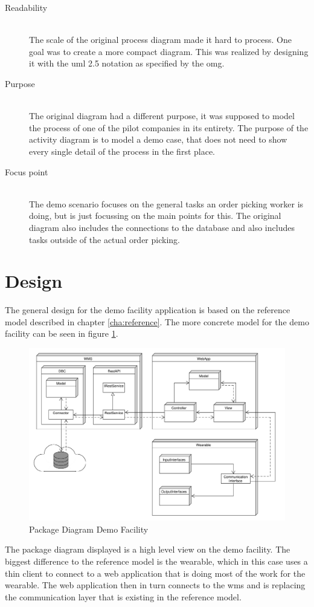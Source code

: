 \begin{description}
	\item[Readability] \hfill \\
	The scale of the original process diagram made it hard to process. One goal was to create a more compact diagram. This was realized by designing it with the \gls{uml} 2.5 notation as specified by the \gls{omg}. \citep{manual:umlnotation}
	\item[Purpose] \hfill \\
	The original diagram had a different purpose, it was supposed to model the process of one of the pilot companies in its entirety. The purpose of the activity diagram is to model a demo case, that does not need to show every single detail of the process in the first place.
	\item[Focus point] \hfill \\
	The demo scenario focuses on the general tasks an order picking worker is doing, but is just focussing on the main points for this. The original diagram also includes the connections to the database and also includes tasks outside of the actual order picking.
\end{description}

\section{Design}
The general design for the demo facility application is based on the reference model described in chapter \ref{cha:reference}. The more concrete model for the demo facility can be seen in figure \ref{fig:ClassDiagramL1}.

\begin{figure}[t]
	\includegraphics[width=\textwidth]{images/ClassDiagram_Level1}
	\caption{Package Diagram Demo Facility}
	\label{fig:ClassDiagramL1}
\end{figure}
The package diagram displayed is a high level view on the demo facility. The biggest difference to the reference model is the wearable, which in this case uses a thin client to connect to a web application that is doing most of the work for the wearable. The web application then in turn connects to the \gls{wms} and is replacing the communication layer that is existing in the reference model.

